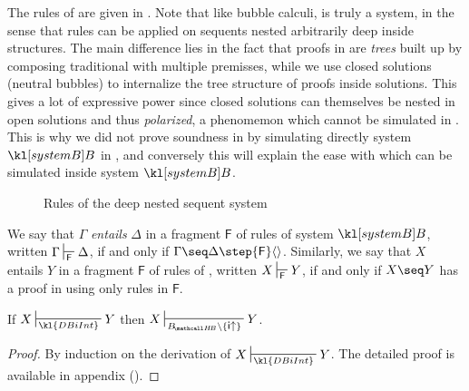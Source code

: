 The rules of  are given in . Note that like
bubble calculi,  is truly a \emph{} system, in the
sense that rules can be applied on sequents nested arbitrarily deep inside
structures. The main difference lies in the fact that
proofs in  are \emph{trees} built up by composing traditional
 with multiple premisses, while we use closed solutions (neutral
bubbles) to internalize the tree structure of proofs inside solutions. This
gives a lot of expressive power since closed solutions can themselves be nested
in open solutions and thus \emph{polarized}, a phenomemon which cannot be
simulated in . This is why we did not prove soundness in
 by simulating directly system $\sysB$ in
, and conversely this will explain the ease with which 
can be simulated inside system $\sysB$.

\begin{figure*}
  
  \caption{Rules of the deep nested sequent system }
\end{figure*}

\begin{definition}
  We say that $\Gamma$ \emph{entails} $\Delta$ in a fragment $\mathsf{F}$ of
  rules of system $\sysB$, written $\Gamma \prov{\mathsf{F}} \Delta$, if and
  only if $\Gamma \seq \Delta \step{\mathsf{F}} \piq{}$. Similarly, we say
  that $X$ entails $Y$ in a fragment $\mathsf{F}$ of rules of ,
  written $X \prov{\mathsf{F}} Y$, if and only if $X \seq Y$ has a proof in
   using only rules in $\mathsf{F}$.
\end{definition}

\begin{lemma}
  
  If $X \prov{\kl{DBiInt}} Y$ then $X \prov{\sysBHB \setminus
  \{\rsf{i{\ua}}\}} Y$.
\end{lemma}
\begin{proof}
  By induction on the derivation of $X \prov{\kl{DBiInt}} Y$. The detailed
  proof is available in appendix (). 
\end{proof}

